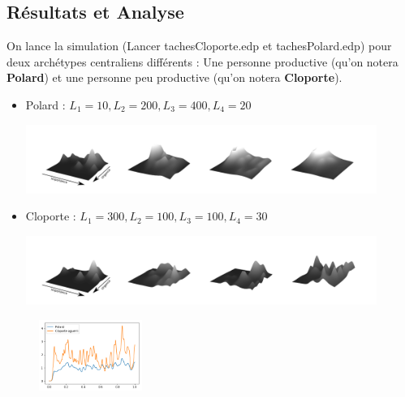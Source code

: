 \documentclass[french]{article}
\begin{document}
    \subsection{Résultats et Analyse}
    On lance la simulation (Lancer tachesCloporte.edp et tachesPolard.edp) pour deux archétypes centraliens différents : Une personne productive (qu'on notera \textbf{Polard}) et une personne peu productive (qu'on notera \textbf{Cloporte}).
    \begin{itemize}
        \item{Polard : $L_1 = 10, L_2 = 200, L_3 = 400, L_4 = 20$}
        \begin{center}
            \includegraphics[width = 0.9\textwidth]{Figures/Evolution/HighProductivity/Stitched.png}
        \end{center}
        \item{Cloporte : $L_1 = 300, L_2 = 100, L_3 = 100, L_4 = 30$} 
        \begin{center}
            \includegraphics[width = 0.9\textwidth]{Figures/Evolution/LowProductivity/Stitched.png}
        \end{center}
    \end{itemize}

    \begin{figure}
        \begin{center}
            \includegraphics[width=0.30\textwidth]{Figures/TravailImpNonFaitDrole.png}
        \end{center}
        \vspace{-60pt}
    \end{figure}
\end{document}
